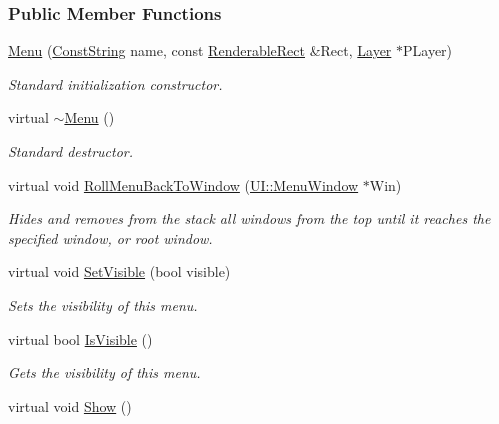 \subsubsection*{Public Member Functions}
\begin{DoxyCompactItemize}
\item 
\hyperlink{classphys_1_1UI_1_1Menu_abe99c5c7a18947dde5d3f44ce6fa0727}{Menu} (\hyperlink{namespacephys_a5ce5049f8b4bf88d6413c47b504ebb31}{ConstString} name, const \hyperlink{structphys_1_1UI_1_1RenderableRect}{RenderableRect} \&Rect, \hyperlink{classphys_1_1UI_1_1Layer}{Layer} $\ast$PLayer)
\begin{DoxyCompactList}\small\item\em Standard initialization constructor. \item\end{DoxyCompactList}\item 
\hypertarget{classphys_1_1UI_1_1Menu_a54b60c45238a3655da9dfa83104adb18}{
virtual \hyperlink{classphys_1_1UI_1_1Menu_a54b60c45238a3655da9dfa83104adb18}{$\sim$Menu} ()}
\label{classphys_1_1UI_1_1Menu_a54b60c45238a3655da9dfa83104adb18}

\begin{DoxyCompactList}\small\item\em Standard destructor. \item\end{DoxyCompactList}\item 
virtual void \hyperlink{classphys_1_1UI_1_1Menu_a7eb3efc2675bf281a829f69416b46327}{RollMenuBackToWindow} (\hyperlink{classphys_1_1UI_1_1MenuWindow}{UI::MenuWindow} $\ast$Win)
\begin{DoxyCompactList}\small\item\em Hides and removes from the stack all windows from the top until it reaches the specified window, or root window. \item\end{DoxyCompactList}\item 
virtual void \hyperlink{classphys_1_1UI_1_1Menu_a4847e0de055a9c2f708f98742fa59a87}{SetVisible} (bool visible)
\begin{DoxyCompactList}\small\item\em Sets the visibility of this menu. \item\end{DoxyCompactList}\item 
virtual bool \hyperlink{classphys_1_1UI_1_1Menu_ae23321617d7e14448e2fab3b455c3dc7}{IsVisible} ()
\begin{DoxyCompactList}\small\item\em Gets the visibility of this menu. \item\end{DoxyCompactList}\item 
\hypertarget{classphys_1_1UI_1_1Menu_aeb6373cc1be7da0bf5966129f271c861}{
virtual void \hyperlink{classphys_1_1UI_1_1Menu_aeb6373cc1be7da0bf5966129f271c861}{Show} ()}
\label{classphys_1_1UI_1_1Menu_aeb6373cc1be7da0bf5966129f271c861}


\end{DoxyCompactItemize}
